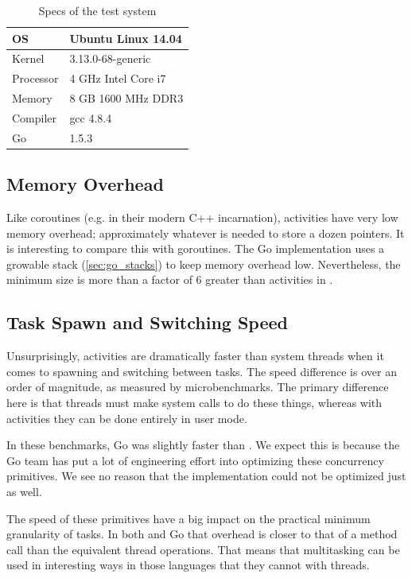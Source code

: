 \documentclass[acmsmall,anonymous,review]{acmart}\settopmatter{printfolios=true,printccs=false,printacmref=false}
\begin{document}
\begin{table}
  \centering
  \begin{tabular}{|l|l|}
    \hline
    OS & Ubuntu Linux 14.04 \\
    \hline
    Kernel & 3.13.0-68-generic \\
    \hline
    Processor & 4 GHz Intel Core i7 \\
    \hline
    Memory & 8 GB 1600 MHz DDR3 \\
    \hline
    Compiler & gcc 4.8.4 \\
    \hline
    Go & 1.5.3 \\
    \hline
  \end{tabular}
  \caption{Specs of the test system}
  \label{table:specs}
\end{table}

\subsection{Memory Overhead}

Like coroutines (e.g. in their modern C++ incarnation), activities have very low memory overhead; approximately whatever is needed to store a dozen pointers.
It is interesting to compare this with goroutines.
The Go implementation uses a growable stack (\textsection\ref{sec:go_stacks}) to keep memory overhead low.
Nevertheless, the minimum size is more than a factor of 6 greater than activities in \charcoal{}.

\subsection{Task Spawn and Switching Speed}

Unsurprisingly, activities are dramatically faster than system threads when it comes to spawning and switching between tasks.
The speed difference is over an order of magnitude, as measured by microbenchmarks.
The primary difference here is that threads must make system calls to do these things, whereas with activities they can be done entirely in user mode.

In these benchmarks, Go was slightly faster than \charcoal{}.
We expect this is because the Go team has put a lot of engineering effort into optimizing these concurrency primitives.
We see no reason that the \charcoal{} implementation could not be optimized just as well.

The speed of these primitives have a big impact on the practical minimum granularity of tasks.
In both \charcoal{} and Go that overhead is closer to that of a method call than the equivalent thread operations.
That means that multitasking can be used in interesting ways in those languages that they cannot with threads.
\end{document}
